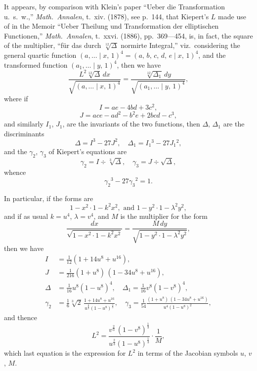 \documentclass[11pt,a4paper]{book}
\begin{document}
It appears, by comparison with Klein's paper ``Ueber die Transformation u.~s.~w.,''
\textit{Math.\ Annalen}, t.~xiv. (1878), see p.~144, that Kiepert's $L$ made use of in the
Memoir ``Ueber Theilung und Transformation der elliptischen Functionen,''
\textit{Math.\ Annalen}, t.~xxvi. (1886), pp.~369---454, is, in fact, the square of the multiplier,
``f\"ur das durch $\sqrt[12]{\Delta}$ normirte Integral,'' viz.\ considering the general quartic function
$(a, \ldots \mid x,\, 1)^4 = (a,\, b,\, c,\, d,\, e \mid x,\, 1)^4$, and the transformed function
$(a_1, \ldots \mid y,\, 1)^4$, then we have
\[
\frac{L^2 \sqrt[12]{\Delta}\, dx}{\sqrt{(a, \ldots \mid x,\, 1)^4}}
= \frac{\sqrt[12]{\Delta_1}\, dy}{\sqrt{(a_1, \ldots \mid y,\, 1)^4}},
\]
where if
\[
I = ae - 4bd + 3c^2,
\]
\[
J = ace - ad^2 - b^2e + 2bcd - c^3,
\]
and similarly $I_1$, $J_1$, are the invariants of the two functions, then $\Delta$, $\Delta_1$ are the
discriminants
\[
\Delta = I^3 - 27J^2, \quad \Delta_1 = I_1{}^3 - 27J_1{}^2,
\]
and the $\gamma_2$, $\gamma_3$ of Kiepert's equations are
\[
\gamma_2 = I \div \sqrt[3]{\Delta}, \quad \gamma_3 = J \div \sqrt{\Delta},
\]
whence
\[
\gamma_2{}^3 - 27\gamma_3{}^2 = 1.
\]

In particular, if the forms are
\[
1 - x^2 \cdot 1 - k^2x^2, \text{ and } 1 - y^2 \cdot 1 - \lambda^2 y^2,
\]
and if as usual $k = u^4$, $\lambda = v^4$, and $M$ is the multiplier for the form
\[
\frac{dx}{\sqrt{1 - x^2 \cdot 1 - k^2x^2}}
= \frac{M\, dy}{\sqrt{1 - y^2 \cdot 1 - \lambda^2 y^2}},
\]
then we have
\begin{align*}
I &= \tfrac{1}{12} (1 + 14u^8 + u^{16}),\\
J &= \tfrac{1}{216} (1 + u^8)\, (1 - 34u^8 + u^{16}),\\
\Delta &= \tfrac{1}{16} u^8 (1 - u^8)^4, \quad
\Delta_1 = \tfrac{1}{16} v^8 (1 - v^8)^4,\\
\gamma_2 &= \tfrac{1}{6} \sqrt[3]{2}\,
\frac{1 + 14u^8 + u^{16}}{u^{\frac{8}{3}} (1 - u^8)^{\frac{4}{3}}}, \quad
\gamma_3 = \tfrac{1}{54}
\frac{(1 + u^8)\, (1 - 34u^8 + u^{16})}{u^4 (1 - u^8)^2},
\end{align*}
and thence
\[
L^2 = \frac{v^{\frac{2}{3}}\, (1 - v^8)^{\frac{1}{3}}}{u^{\frac{2}{3}} (1 - u^8)^{\frac{1}{3}}} \cdot \frac{1}{M},
\]
which last equation is the expression for $L^2$ in terms of the Jacobian symbols $u$, $v$, $M$.
\end{document}
